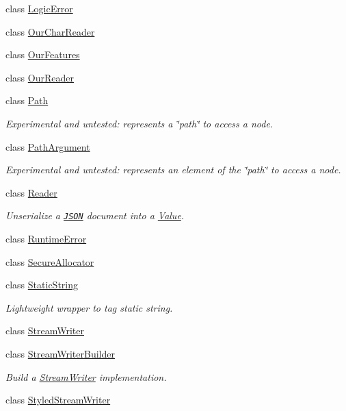 \begin{DoxyCompactItemize}
class \hyperlink{classJson_1_1LogicError}{Logic\+Error}
\item 
class \hyperlink{classJson_1_1OurCharReader}{Our\+Char\+Reader}
\item 
class \hyperlink{classJson_1_1OurFeatures}{Our\+Features}
\item 
class \hyperlink{classJson_1_1OurReader}{Our\+Reader}
\item 
class \hyperlink{classJson_1_1Path}{Path}
\begin{DoxyCompactList}\small\item\em Experimental and untested\+: represents a \char`\"{}path\char`\"{} to access a node. \end{DoxyCompactList}\item 
class \hyperlink{classJson_1_1PathArgument}{Path\+Argument}
\begin{DoxyCompactList}\small\item\em Experimental and untested\+: represents an element of the \char`\"{}path\char`\"{} to access a node. \end{DoxyCompactList}\item 
class \hyperlink{classJson_1_1Reader}{Reader}
\begin{DoxyCompactList}\small\item\em Unserialize a \href{http://www.json.org}{\tt J\+S\+ON} document into a \hyperlink{classJson_1_1Value}{Value}. \end{DoxyCompactList}\item 
class \hyperlink{classJson_1_1RuntimeError}{Runtime\+Error}
\item 
class \hyperlink{classJson_1_1SecureAllocator}{Secure\+Allocator}
\item 
class \hyperlink{classJson_1_1StaticString}{Static\+String}
\begin{DoxyCompactList}\small\item\em Lightweight wrapper to tag static string. \end{DoxyCompactList}\item 
class \hyperlink{classJson_1_1StreamWriter}{Stream\+Writer}
\item 
class \hyperlink{classJson_1_1StreamWriterBuilder}{Stream\+Writer\+Builder}
\begin{DoxyCompactList}\small\item\em Build a \hyperlink{classJson_1_1StreamWriter}{Stream\+Writer} implementation. \end{DoxyCompactList}\item 
class \hyperlink{classJson_1_1StyledStreamWriter}{Styled\+Stream\+Writer}

\end{DoxyCompactItemize}

